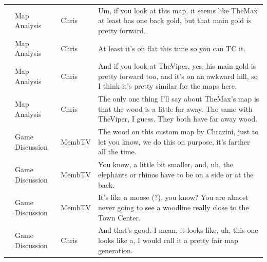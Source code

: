 {\begin{longtable}{@{}>{\theAppRow}r|L{2.3cm}L{1.0cm}U{11.55cm}@{}}
    & Map Analysis          & Chris        & Um, if you look at this map, it seems like TheMax at least has one back gold, but that main gold is pretty forward.                                                                                                                                              \\
    & Map Analysis          & Chris        & At least it's on flat this time so you can TC it.                                                                                                                                                                                                                \\
    & Map Analysis          & Chris        & And if you look at TheViper, yes, his main gold is pretty forward too, and it's on an awkward hill, so I think it's pretty similar for the maps here.                                                                                                            \\
    & Map Analysis          & Chris        & The only one thing I'll say about TheMax's map is that the wood is a little far away. The same with TheViper, I guess. They both have far away wood.                                                                                                             \\
    & Game Discussion      & MembTV       & The wood on this custom map by Chrazini, just to let you know, we do this on purpose, it's farther all the time.                                                                                                                                                 \\
    & Game Discussion      & MembTV       & You know, a little bit smaller, and, uh, the elephants or rhinos have to be on a side or at the back.                                                                                                                                                            \\
    & Game Discussion      & MembTV       & It's like a moose (?), you know? You are almost never going to see a woodline really close to the Town Center.                                                                                                                                                   \\
    & Game Discussion      & Chris        & And that's good. I mean, it looks like, uh, this one looks like a, I would call it a pretty fair map generation.                                                                                                                                                 \\

\end{longtable}}
